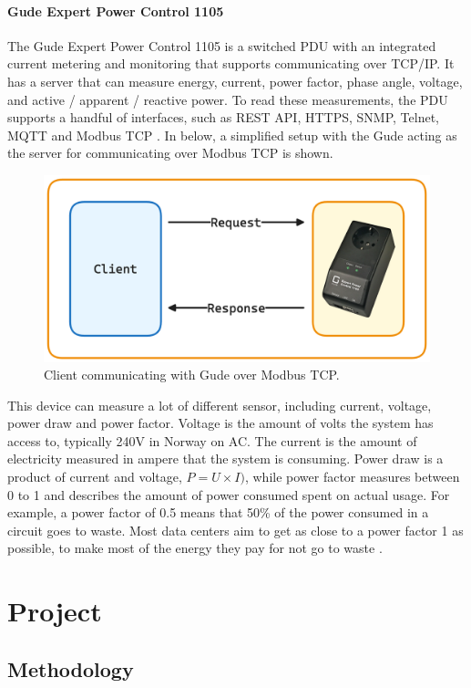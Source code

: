 \documentclass[
  table]{report}
\begin{document}
\subsection{Gude Expert Power Control 1105}

The Gude Expert Power Control 1105 is a switched PDU with an integrated
current metering and monitoring that supports communicating over TCP/IP.
It has a server that can measure energy, current, power factor, phase
angle, voltage, and active / apparent / reactive power. To read these
measurements, the PDU supports a handful of interfaces, such as REST
API, HTTPS, SNMP, Telnet, \ac{MQTT} and Modbus TCP
\citep{gmbhExpertPowerControl2023}. In  below, a
simplified setup with the Gude acting as the server for communicating
over Modbus TCP is shown.

\begin{figure}[H]
\centering
  \includegraphics[width=0.5\columnwidth]{assets/3-modbus-gude.png}
  \caption{Client communicating with Gude over Modbus TCP.}
  \label{fig:gude-control}
\end{figure}

This device can measure a lot of different sensor, including current,
voltage, power draw and power factor. Voltage is the amount of volts the
system has access to, typically 240V in Norway on AC. The current is the
amount of electricity measured in ampere that the system is consuming.
Power draw is a product of current and voltage, \(P = U \times I)\),
while power factor measures between 0 to 1 and describes the amount of
power consumed spent on actual usage. For example, a power factor of 0.5
means that 50\% of the power consumed in a circuit goes to waste. Most
data centers aim to get as close to a power factor 1 as possible, to
make most of the energy they pay for not go to waste
\citep{rasmussenImpactLeadingPower2018}.

\part{Project}

\chapter{Methodology} 
\label{chap:method}
\end{document}
